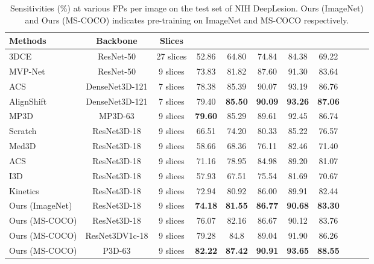 \documentclass[journal,twoside,web]{ieeecolor}
\begin{document}
\begin{table*}[!t]
    \setlength{\belowcaptionskip}{5pt}
    \caption{Sensitivities (\%) at various FPs per image on the test set of NIH DeepLesion. Ours (ImageNet) and Ours (MS-COCO) indicates pre-training on ImageNet and MS-COCO respectively.}
    \label{SOTA}
    \centering
    \footnotesize \setlength{\tabcolsep}{11pt}\renewcommand{\arraystretch}{1.2}\centering
        \label{tab:sample_1}
        \begin{tabular}{lcccccccccc}
            \toprule
            \textbf{Methods}  & \textbf{Backbone} & \textbf{Slices}  &  &  &  &  &  & \\             \midrule
            3DCE~\cite{yan20183d}  &  ResNet-50 & 27 slices &  52.86 & 64.80 & 74.84 & 84.38 & 69.22  \\
MVP-Net~\cite{li2019mvp}  & ResNet-50 & 9 slices & 73.83 & 81.82 & 87.60 & 91.30 & 83.64 \\    
ACS~\cite{yang2019reinventing}  & DenseNet3D-121 & 7 slices & 78.38 & 85.39 & 90.07 & 93.19 & 86.76 \\
            AlignShift~\cite{yang2020alignshift}  & DenseNet3D-121 & 7 slices & 79.40 & \textbf{85.50} & \textbf{90.09} & \textbf{93.26} & \textbf{87.06} \\
MP3D~\cite{zhang2020revisiting}  & MP3D-63 & 9 slices &  \textbf{79.60} & 85.29 & 89.61  & 92.45  & 86.74  \\   \midrule         
            Scratch & ResNet3D-18 & 9 slices & 66.51 & 74.20 &  80.33 &  85.22 &  76.57 \\ 
            Med3D & ResNet3D-18 & 9 slices & 58.66 & 68.36 & 76.11 & 82.46  & 71.40  \\
ACS & ResNet3D-18 & 9 slices & 71.16 & 78.95 & 84.98 & 89.20  & 81.07 \\
            I3D & ResNet3D-18 & 9 slices & 57.93 & 67.51 & 75.54 & 81.69 & 70.67 \\
            Kinetics & ResNet3D-18 & 9 slices & 72.94 & 80.92 & 86.00 & 89.91 & 82.44 \\
            Ours (ImageNet) & ResNet3D-18 & 9 slices & \textbf{74.18} & \textbf{81.55} & \textbf{86.77} & \textbf{90.68} & \textbf{83.30} \\\midrule
            Ours (MS-COCO) & ResNet3D-18 & 9 slices & 76.07 & 82.16 & 86.67 & 90.12 & 83.76 \\ 
            Ours (MS-COCO) & ResNet3DV1c-18 & 9 slices & 79.28 & 84.8 & 89.04 & 91.90 & 86.26 \\
Ours (MS-COCO)  & P3D-63 & 9 slices &  \textbf{82.22} & \textbf{87.42} & \textbf{90.91} & \textbf{93.65} & \textbf{88.55}   \\ \bottomrule
        \end{tabular}
\end{table*}
\end{document}
